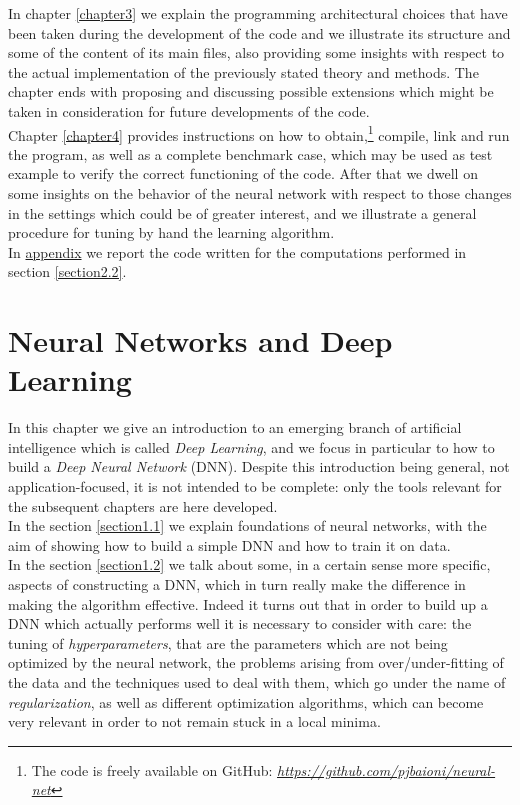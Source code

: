 \documentclass[12pt, a4paper]{report}
\theoremstyle{definition}
\begin{document}
In chapter \ref{chapter3} we explain the programming architectural choices that have been taken during the development of the code and we illustrate its structure and some of the content of its main files, also providing some insights with respect to the actual implementation of the previously stated theory and methods. The chapter ends with proposing and discussing possible extensions which might be taken in consideration for future developments of the code.\\
Chapter \ref{chapter4} provides instructions on how to obtain,\footnote{The code is freely available on GitHub: \href{https://github.com/pjbaioni/neural-net}{\emph{https://github.com/pjbaioni/neural-net}}} compile, link and run the program, as well as a complete benchmark case, which may be used as test example to verify the correct functioning of the code. After that we dwell on some insights on the behavior of the neural network with respect to those changes in the settings which could be of greater interest, and we illustrate a general procedure for tuning by hand the learning algorithm.\\
In \hyperref[appendix]{appendix} we report the \cite{freefem++} code written for the computations performed in section \ref{section2.2}.




\chapter{Neural Networks and Deep Learning}\label{chapter1}
In this chapter we give an introduction to an emerging branch of artificial intelligence which is called \textit{Deep Learning}, and we focus in particular to how to build a \textit{Deep Neural Network} (DNN). Despite this introduction being general, not application-focused, it is not intended to be complete: only the tools relevant for the subsequent chapters are here developed.\\
In the section \ref{section1.1} we explain foundations of neural networks, with the aim of showing how to build a simple DNN and how to train it on data.\\
In the section \ref{section1.2} we talk about some, in a certain sense more specific, aspects of constructing a DNN, which in turn really make the difference in making the algorithm effective. Indeed it turns out that in order to build up a DNN which actually performs well it is necessary to consider with care: the tuning of \textit{hyperparameters}, that are the parameters which are not being optimized by the neural network, the problems arising from over/under-fitting of the data and the techniques used to deal with them, which go under the name of \textit{regularization}, as well as different optimization algorithms, which can become very relevant in order to not remain stuck in a local minima.\\
\newpage
\end{document}
